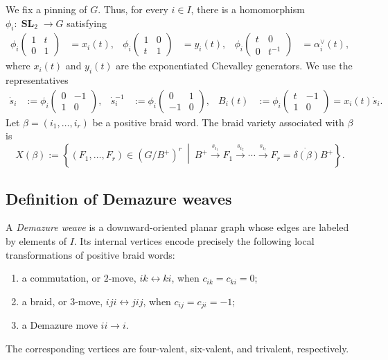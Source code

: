\documentclass[12pt, reqno]{amsart}
\theoremstyle{plain}
\theoremstyle{definition}
\numberwithin{equation}{section}
\newcommand{\SL}{\operatorname{\mathbf{SL}}}
\begin{document}
We fix a pinning of \(G\). Thus, for every \(i\in I\), there is a
homomorphism \(\phi_i\colon\SL_2\to G\) satisfying
\begin{align*}
    \phi_i\!\begin{pmatrix}1&t\\0&1\end{pmatrix}&=x_i(t), &
    \phi_i\!\begin{pmatrix}1&0\\t&1\end{pmatrix}&=y_i(t), &
    \phi_i\!\begin{pmatrix}t&0\\0&t^{-1}\end{pmatrix}&=\alpha_i^\vee(t),
\end{align*}
where \(x_i(t)\) and \(y_i(t)\) are the exponentiated Chevalley
generators. We use the representatives
\begin{align*}
    \dot s_i
    &:=
    \phi_i\!\begin{pmatrix}0&-1\\1&0\end{pmatrix}, &
    \dot s_i^{-1}
    &:=
    \phi_i\!\begin{pmatrix}0&1\\-1&0\end{pmatrix}, &
    B_i(t)
    &:=
    \phi_i\!\begin{pmatrix}t&-1\\1&0\end{pmatrix}
    =x_i(t)\dot s_i.
\end{align*}
 Let
\(\beta=(i_1,\ldots,i_r)\) be a positive braid word. The braid variety associated with \(\beta\) is
\begin{equation}\label{eq:braid-variety-flags}
    X(\beta)
    :=
    \left\{
        (F_1,\ldots,F_r)\in(G/B^+)^r
        \ \middle|\
        B^+\xrightarrow{s_{i_1}}F_1
        \xrightarrow{s_{i_2}}\cdots
        \xrightarrow{s_{i_r}}F_r
        =\dot{\delta(\beta)}B^+
    \right\}.
\end{equation}

\subsection{Definition of Demazure weaves}
A \emph{Demazure weave} is a downward-oriented planar graph whose edges
are labeled by elements of \(I\). Its internal vertices encode precisely
the following local transformations of positive braid words:
\begin{enumerate}
    \item a commutation, or \(2\)-move,
    \(ik\longleftrightarrow ki\), when \(c_{ik}=c_{ki}=0\);

    \item a braid, or \(3\)-move,
    \(iji\longleftrightarrow jij\), when
    \(c_{ij}=c_{ji}=-1\);

    \item a Demazure move \(ii\longrightarrow i\).
\end{enumerate}
The corresponding vertices are four-valent, six-valent, and trivalent,
respectively.
\end{document}

